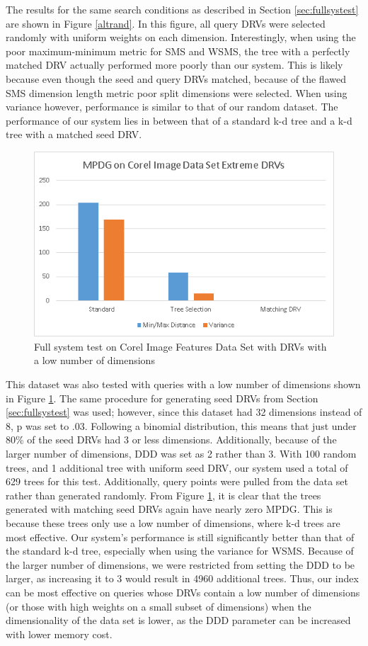 The results for the same search conditions as described in Section \ref{sec:fullsystest} are shown in Figure \ref{altrand}.  In this figure, all query DRVs were selected randomly with uniform weights on each dimension.  Interestingly, when using the poor maximum-minimum metric for SMS and WSMS, the tree with a perfectly matched DRV actually performed more poorly than our system.  This is likely because even though the seed and query DRVs matched, because of the flawed SMS dimension length metric poor split dimensions were selected.  When using variance however, performance is similar to that of our random dataset.  The performance of our system lies in between that of a standard k-d tree and a k-d tree with a matched seed DRV.

\begin{figure}[h]
\begin{center}
\includegraphics[width=.85\textwidth]{Figures/altext}
\end{center}
\caption{Full system test on Corel Image Features Data Set with DRVs with a low number of dimensions}
\label{fig:altext}
\end{figure}

This dataset was also tested with queries with a low number of dimensions shown in Figure \ref{fig:altext}.  The same procedure for generating seed DRVs from Section \ref{sec:fullsystest} was used; however, since this dataset had 32 dimensions instead of 8, p was set to .03.  Following a binomial distribution, this means that just under 80\% of the seed DRVs had 3 or less dimensions.  Additionally, because of the larger number of dimensions, DDD was set as 2 rather than 3.  With 100 random trees, and 1 additional tree with uniform seed DRV, our system used a total of 629 trees for this test.  Additionally, query points were pulled from the data set rather than generated randomly.  From Figure \ref{fig:altext}, it is clear that the trees generated with matching seed DRVs again have nearly zero MPDG.  This is because these trees only use a low number of dimensions, where k-d trees are most effective.  Our system's performance is still significantly better than that of the standard k-d tree, especially when using the variance for WSMS.  Because of the larger number of dimensions, we were restricted from setting the DDD to be larger, as increasing it to 3 would result in 4960 additional trees.  Thus, our index can be most effective on queries whose DRVs contain a low number of dimensions (or those with high weights on a small subset of dimensions) when the dimensionality of the data set is lower, as the DDD parameter can be increased with lower memory cost.